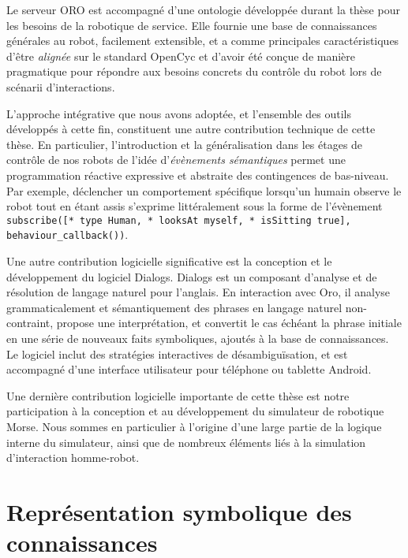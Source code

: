 Le serveur ORO est accompagné d'une ontologie développée durant la thèse pour
les besoins de la robotique de service. Elle fournie une base de connaissances
générales au robot, facilement extensible, et a comme principales
caractéristiques d'être \emph{alignée} sur le standard {\sc OpenCyc} et d'avoir
été conçue de manière pragmatique pour répondre aux besoins concrets du
contrôle du robot lors de scénarii d'interactions.

L'approche intégrative que nous avons adoptée, et l'ensemble des outils
développés à cette fin, constituent une autre contribution technique de cette
thèse. En particulier, l'introduction et la généralisation dans les étages de
contrôle de nos robots de l'idée d'\emph{évènements sémantiques} permet une
programmation réactive expressive et abstraite des contingences de bas-niveau.
Par exemple, déclencher un comportement spécifique lorsqu'un humain observe le
robot tout en étant assis s'exprime littéralement sous la forme de l'évènement
{\tt subscribe([* type Human, * looksAt myself, * isSitting true],
behaviour\_callback())}.

Une autre contribution logicielle significative est la conception et le
développement du logiciel {\sc Dialogs}. {\sc Dialogs} est un composant
d'analyse et de résolution de langage naturel pour l'anglais. En interaction
avec {\sc Oro}, il analyse grammaticalement et sémantiquement des phrases en
langage naturel non-contraint, propose une interprétation, et convertit le cas
échéant la phrase initiale en une série de nouveaux faits symboliques, ajoutés
à la base de connaissances. Le logiciel inclut des stratégies interactives de
désambiguïsation, et est accompagné d'une interface utilisateur pour téléphone
ou tablette Android.

Une dernière contribution logicielle importante de cette thèse est notre
participation à la conception et au développement du simulateur de robotique
{\sc Morse}. Nous sommes en particulier à l'origine d'une large partie de la
logique interne du simulateur, ainsi que de nombreux éléments liés à la
simulation d'interaction homme-robot.


\section{Représentation symbolique des connaissances}

